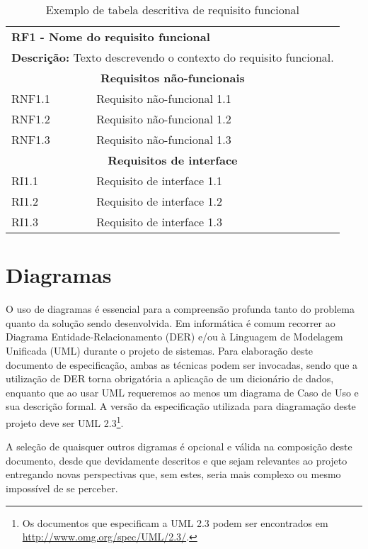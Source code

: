 \documentclass[12pt,openright,a4paper,brazil]{abntex2}
\begin{document}
\begin{table}
	\caption{Exemplo de tabela descritiva de requisito funcional}
	\label{tab:rf}
	\centering
	\begin{tabular}{|p{.2\linewidth}|p{.75\linewidth}|}
		\hline
		\multicolumn{2}{|l|}{
			\textbf{RF1 - Nome do requisito funcional}
		} \\
		\multicolumn{2}{|l|}{
			\textbf{Descrição:} Texto descrevendo o contexto do requisito funcional.
		} \\ \hline
		\multicolumn{2}{|c|}{
			\textbf{Requisitos não-funcionais}
		} \\ \hline
		RNF1.1 & Requisito não-funcional 1.1 \\ \hline
		RNF1.2 & Requisito não-funcional 1.2 \\ \hline
		RNF1.3 & Requisito não-funcional 1.3 \\ 
		\hline
		\multicolumn{2}{|c|}{
			\textbf{Requisitos de interface}
		} \\ \hline
		RI1.1 & Requisito de interface 1.1 \\ \hline
		RI1.2 & Requisito de interface 1.2 \\ \hline
		RI1.3 & Requisito de interface 1.3 \\
		\hline
	\end{tabular}
\end{table}


\chapter{Diagramas}

O uso de diagramas é essencial para a compreensão profunda tanto do problema quanto da solução sendo desenvolvida. Em informática é comum recorrer ao Diagrama Entidade-Relacionamento (DER) e/ou à Linguagem de Modelagem Unificada (UML) durante o projeto de sistemas. Para elaboração deste documento de especificação, ambas as técnicas podem ser invocadas, sendo que a utilização de DER torna obrigatória a aplicação de um dicionário de dados, enquanto que ao usar UML requeremos ao menos um diagrama de Caso de Uso e sua descrição formal. A versão da especificação utilizada para diagramação deste projeto deve ser UML 2.3\footnote{Os documentos que especificam a UML 2.3 podem ser encontrados em \url{http://www.omg.org/spec/UML/2.3/}.}.

A seleção de quaisquer outros digramas é opcional e válida na composição deste documento, desde que devidamente descritos e que sejam relevantes ao projeto entregando novas perspectivas que, sem estes, seria mais complexo ou mesmo impossível de se perceber.
\end{document}
